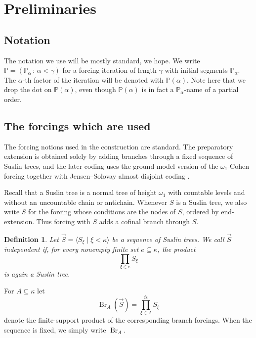 \documentclass[a4paper,11pt]{article}
\newtheorem{definition}[theorem]{Definition}
\newcommand{\forceP}{\mathbb{P}}
\begin{document}
\section{Preliminaries}

\subsection{Notation}
The notation we use will be mostly standard, we hope. We write $\forceP=(\forceP_{\alpha} \, : \, \alpha < \gamma)$ for a forcing iteration of length $\gamma$ with initial segments $\forceP_{\alpha}$. The $\alpha$-th factor of the iteration will be denoted with $\forceP(\alpha)$. Note here that we drop the dot on $\forceP(\alpha)$, even though $\forceP(\alpha)$ is in fact a $\forceP_{\alpha}$-name of a partial order. 



\subsection{The forcings which are used}
The forcing notions used in the construction are standard. The preparatory extension is
obtained solely by adding branches through a fixed sequence of Suslin trees,
and the later coding uses the ground-model version of the $\omega_1$-Cohen
forcing together with Jensen--Solovay almost disjoint coding \cite{JensenSolovay}.

Recall that a Suslin tree is a normal tree of height $\omega_1$ with countable
levels and without an uncountable chain or antichain.  Whenever $S$ is a Suslin
tree, we also write $S$ for the forcing whose conditions are the nodes of $S$,
ordered by end-extension.  Thus forcing with $S$ adds a cofinal branch through
$S$.

\begin{definition}
Let $\vec{S}=\langle S_\xi\mid \xi<\kappa\rangle$ be a sequence of Suslin
trees.  We call $\vec{S}$ \emph{independent} if, for every nonempty finite set
$e\subseteq\kappa$, the product
\[
   \prod_{\xi\in e}S_\xi
\]
is again a Suslin tree.
\end{definition}

For $A\subseteq\kappa$ let
\[
   \operatorname{Br}_A(\vec S)=\prod_{\xi\in A}^{\mathrm{fs}}S_\xi
\]
denote the finite-support product of the corresponding branch forcings.  When
the sequence is fixed, we simply write $\operatorname{Br}_A$.
\end{document}
